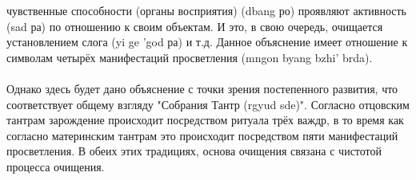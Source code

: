 чувственные способности (органы вос\-приятия) (dbang ро) проявляют активность (sad ра) по
отноше\-нию к своим объектам. И это, в свою очередь, очищается установлением слога (yi ge
'god ра) и т.д. Данное объяснение имеет отношение к символам четырёх манифестаций
просвет\-ления (mngon byang bzhi' brda).\\
\\
Однако здесь будет дано объяснение с точки зрения постепен\-ного развития, что
соответствует общему взгляду "Собрания Тантр (rgyud sde)". Согласно отцовским тантрам
зарождение происходит посредством ритуала трёх важдр, в то время как согласно
материнским тантрам это проис\-ходит посредством пяти мани\-фестаций просветления. В
обеих этих традициях, основа очищения связана с чистотой процесса очищения.\\
\\

